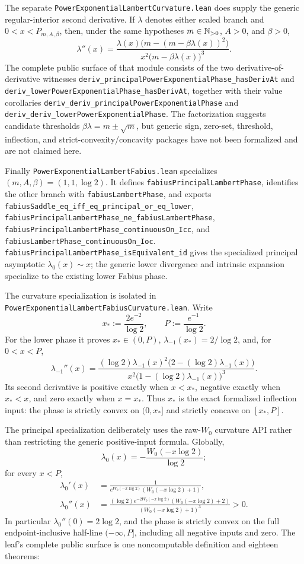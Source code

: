 \documentclass[11pt,oneside]{article}
\theoremstyle{definition}
\theoremstyle{remark}
\begin{document}
The separate \nolinkurl{PowerExponentialLambertCurvature.lean} does supply
the generic regular-interior second derivative.  If \(\lambda\) denotes
either scaled branch and
\(0<x<P_{m,A,\beta}\), then, under the same hypotheses
\(m\in\mathbb{N}_{>0}\), \(A>0\), and \(\beta>0\),
\[
 \lambda''(x)=
 \frac{\lambda(x)\bigl(m-(m-\beta\lambda(x))^2\bigr)}
      {x^2\bigl(m-\beta\lambda(x)\bigr)^3}.
\]
The complete public surface of that module consists of the two
derivative-of-derivative witnesses
\nolinkurl{deriv_principalPowerExponentialPhase_hasDerivAt} and
\nolinkurl{deriv_lowerPowerExponentialPhase_hasDerivAt}, together with their
value corollaries
\nolinkurl{deriv_deriv_principalPowerExponentialPhase} and
\nolinkurl{deriv_deriv_lowerPowerExponentialPhase}.  The factorization
suggests candidate thresholds
\(\beta\lambda=m\mathbin{\pm}\sqrt m\), but generic sign, zero-set,
threshold, inflection, and strict-convexity/concavity packages have not been
formalized and are not claimed here.

Finally \nolinkurl{PowerExponentialLambertFabius.lean} specializes
\((m,A,\beta)=(1,1,\log2)\).  It defines
\nolinkurl{fabiusPrincipalLambertPhase}, identifies the other branch with
\nolinkurl{fabiusLambertPhase}, and exports
\nolinkurl{fabiusSaddle_eq_iff_eq_principal_or_eq_lower},
\nolinkurl{fabiusPrincipalLambertPhase_ne_fabiusLambertPhase},
\nolinkurl{fabiusPrincipalLambertPhase_continuousOn_Icc}, and
\nolinkurl{fabiusLambertPhase_continuousOn_Ioc}.
\nolinkurl{fabiusPrincipalLambertPhase_isEquivalent_id} gives the
specialized principal asymptotic \(\lambda_0(x)\sim x\); the generic lower
divergence and intrinsic expansion specialize to the existing lower Fabius
phase.

The curvature specialization is isolated in
\nolinkurl{PowerExponentialLambertFabiusCurvature.lean}.  Write
\[
 x_*:=\frac{2e^{-2}}{\log2},
 \qquad P:=\frac{e^{-1}}{\log2}.
\]
For the lower phase it proves \(x_*\in(0,P)\),
\(\lambda_{-1}(x_*)=2/\log2\), and, for \(0<x<P\),
\[
 \lambda_{-1}''(x)=
 \frac{(\log2)\lambda_{-1}(x)^2
       \bigl(2-(\log2)\lambda_{-1}(x)\bigr)}
      {x^2\bigl(1-(\log2)\lambda_{-1}(x)\bigr)^3}.
\]
Its second derivative is positive exactly when \(x<x_*\), negative exactly
when \(x_*<x\), and zero exactly when \(x=x_*\).  Thus \(x_*\) is the exact
formalized inflection input: the phase is strictly convex on
\((0,x_*]\) and strictly concave on \([x_*,P]\).

The principal specialization deliberately uses the raw-\(W_0\) curvature
API rather than restricting the generic positive-input formula.  Globally,
\[
 \lambda_0(x)=-\frac{W_0(-x\log2)}{\log2};
\]
for every \(x<P\),
\[
\begin{aligned}
 \lambda_0'(x)
   &=\frac{1}{e^{W_0(-x\log2)}(W_0(-x\log2)+1)},\\
 \lambda_0''(x)
   &=\frac{(\log2)e^{-2W_0(-x\log2)}(W_0(-x\log2)+2)}
           {(W_0(-x\log2)+1)^3}>0.
\end{aligned}
\]
In particular \(\lambda_0''(0)=2\log2\), and the phase is strictly convex
on the full endpoint-inclusive half-line \((-\infty,P]\), including all
negative inputs and zero.  The leaf's complete public surface is one
noncomputable definition and eighteen theorems:
\end{document}
